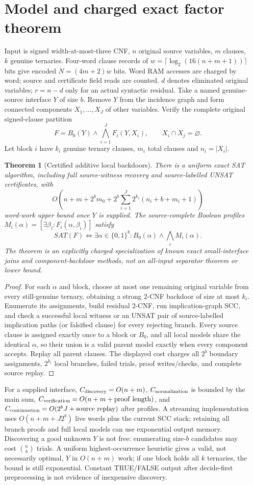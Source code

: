 \documentclass[11pt]{article}
\newtheorem{theorem}{Theorem}
\begin{document}
\section{Model and charged exact factor theorem}
Input is signed width-at-most-three CNF, $n$ original source variables, $m$ clauses, $k$ genuine ternaries. Four-word clause records of $w=\lceil\log_2(16(n+m+1))\rceil$ bits give encoded $N=(4m+2)w$ bits. Word RAM accesses are charged by word; source and certificate field reads are counted. $d$ denotes eliminated original variables; $r=n-d$ only for an actual syntactic residual.
Take a named genuine-source interface $Y$ of size $b$. Remove $Y$ from the incidence graph and form connected components $X_1,\ldots,X_J$ of other variables. Verify the complete original signed-clause partition
\[
F=B_0(Y)\wedge\bigwedge_{i=1}^J F_i(Y,X_i),
\qquad X_i\cap X_j=\varnothing.
\]
Let block $i$ have $k_i$ genuine ternary clauses, $m_i$ total clauses and $n_i=|X_i|$.
\begin{theorem}[Certified additive local backdoors]
There is a uniform exact SAT algorithm, including full source-witness recovery and source-labelled UNSAT certificates, with
\[
O\left(n+m+2^b m_0+
2^b\sum_{i=1}^{J} 2^{k_i}(n_i+b+m_i+1)\right)
\]
word-work upper bound once $Y$ is supplied. The source-complete Boolean profiles
$M_i(\alpha)=[\exists\beta_i:F_i(\alpha,\beta_i)]$
satisfy
\[
SAT(F)\Longleftrightarrow
\exists\alpha\in\{0,1\}^b:
B_0(\alpha)\wedge\bigwedge_i M_i(\alpha).
\]
The theorem is an explicitly charged specialization of known exact small-interface joins and component-backdoor methods, not an all-input separator theorem or lower bound.
\end{theorem}
\begin{proof}
For each $\alpha$ and block, choose at most one remaining original variable from every still-genuine ternary, obtaining a strong 2-CNF backdoor of size at most $k_i$. Enumerate its assignments, build residual 2-CNF, run implication-graph SCC, and check a successful local witness or an UNSAT pair of source-labelled implication paths (or falsified clause) for every rejecting branch. Every source clause is assigned exactly once to a block or $B_0$, and all local models share the identical $\alpha$, so their union is a valid parent model exactly when every component accepts. Replay all parent clauses. The displayed cost charges all $2^b$ boundary assignments, $2^{k_i}$ local branches, failed trials, proof writes/checks, and complete source replay.
\end{proof}
For a supplied interface, $C_{\rm discovery}=O(n+m)$, $C_{\rm normalization}$ is bounded by the main sum, $C_{\rm verification}=O(n+m+\mathrm{proof\ length})$, and $C_{\rm continuation}=O(2^b J+\mathrm{source\ replay})$ after profiles. A streaming implementation uses $O(n+m+J2^b)$ live words plus the current SCC stack; retaining all branch proofs and full local models can use exponential output memory. Discovering a good unknown $Y$ is not free: enumerating size-$b$ candidates may cost $\binom nb$ trials. A uniform highest-occurrence heuristic gives a valid, not necessarily optimal, $Y$ in $O(n+m)$ work; if one block holds all $k$ ternaries, the bound is still exponential. Constant TRUE/FALSE output after decide-first preprocessing is not evidence of inexpensive discovery.
\end{document}
